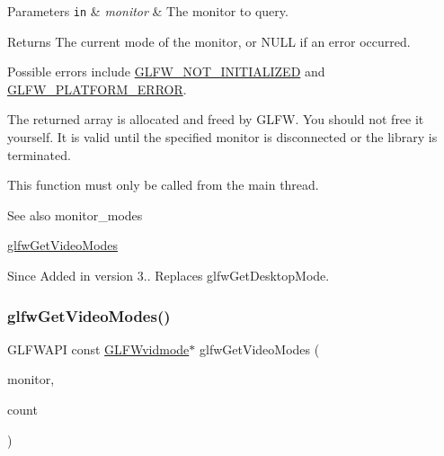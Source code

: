 \begin{DoxyParams}[1]{Parameters}
\mbox{\tt in}  & {\em monitor} & The monitor to query. \\
\hline
\end{DoxyParams}
\begin{DoxyReturn}{Returns}
The current mode of the monitor, or {\ttfamily N\+U\+LL} if an error occurred.
\end{DoxyReturn}
Possible errors include \hyperlink{group__errors_ga2374ee02c177f12e1fa76ff3ed15e14a}{G\+L\+F\+W\+\_\+\+N\+O\+T\+\_\+\+I\+N\+I\+T\+I\+A\+L\+I\+Z\+ED} and \hyperlink{group__errors_gad44162d78100ea5e87cdd38426b8c7a1}{G\+L\+F\+W\+\_\+\+P\+L\+A\+T\+F\+O\+R\+M\+\_\+\+E\+R\+R\+OR}.

The returned array is allocated and freed by G\+L\+FW. You should not free it yourself. It is valid until the specified monitor is disconnected or the library is terminated.

This function must only be called from the main thread.

\begin{DoxySeeAlso}{See also}
monitor\+\_\+modes 

\hyperlink{group__monitor_ga811c28d61595e630774389985947c665}{glfw\+Get\+Video\+Modes}
\end{DoxySeeAlso}
\begin{DoxySince}{Since}
Added in version 3.. Replaces {\ttfamily glfw\+Get\+Desktop\+Mode}. 
\end{DoxySince}
\mbox{\label{group__monitor_ga811c28d61595e630774389985947c665}} 
\subsubsection{\texorpdfstring{glfw\+Get\+Video\+Modes()}{glfwGetVideoModes()}}
{\footnotesize\ttfamily G\+L\+F\+W\+A\+PI const \hyperlink{structGLFWvidmode}{G\+L\+F\+Wvidmode}$\ast$ glfw\+Get\+Video\+Modes (\begin{DoxyParamCaption}\item[{\hyperlink{group__monitor_ga8d9efd1cde9426692c73fe40437d0ae3}{G\+L\+F\+Wmonitor} $\ast$}]{monitor,  }\item[{int $\ast$}]{count }\end{DoxyParamCaption})}



